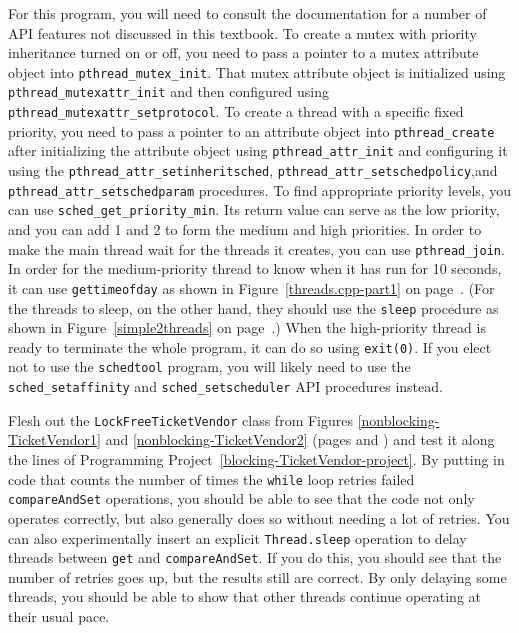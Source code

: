 \begin{chapterEnumerate}
For this program, you will need to consult the documentation for a number of API features not discussed in this textbook.  To create a mutex with priority inheritance turned on or off, you need to pass a pointer to a mutex attribute object into \verb|pthread_mutex_init|.  That mutex attribute object is initialized using \verb|pthread_mutexattr_init| and then configured using \verb|pthread_mutexattr_setprotocol|.  To create a thread with a specific fixed priority, you need to pass a pointer to an attribute object into \verb|pthread_create| after initializing the attribute object using \verb|pthread_attr_init| and configuring it using the \verb|pthread_attr_setinheritsched|, \verb|pthread_attr_setschedpolicy|,\linebreak[4] and \verb|pthread_attr_setschedparam| procedures.  To find appropriate priority levels, you can use \verb|sched_get_priority_min|.  Its return value can serve as the low priority, and you can add 1 and 2 to form the medium and high priorities.  In order to make the main thread wait for the threads it creates, you can use \verb|pthread_join|.  In order for the medium-priority thread to know when it has run for 10 seconds, it can use \verb|gettimeofday| as shown in Figure~\ref{threads.cpp-part1} on page~\pageref{threads.cpp-part1}.  (For the threads to sleep, on the other hand, they should use the \verb|sleep| procedure as
shown in Figure~\ref{simple2threads} on page~\pageref{simple2threads}.)  When the high-priority thread is ready to terminate the whole program, it can do so using \verb|exit(0)|.
If you elect not to use the \verb|schedtool| program, you will likely need to use the \verb|sched_setaffinity| and \verb|sched_setscheduler| API procedures instead.
\item\label{nonblocking-TicketVendor-project}
Flesh out the \texttt{LockFreeTicketVendor} class from Figures \ref{nonblocking-TicketVendor1} and \ref{nonblocking-TicketVendor2} (pages \pageref{nonblocking-TicketVendor1} and \pageref{nonblocking-TicketVendor2}) and test it along the lines of Programming Project~\ref{blocking-TicketVendor-project}. By putting in code that counts the number of times the \texttt{while} loop retries failed \texttt{compareAndSet} operations, you should be able to see that the code not only operates correctly, but also generally does so without needing a lot of retries.  You can also experimentally insert an explicit \texttt{Thread.sleep} operation to delay threads between \texttt{get} and \texttt{compareAndSet}.  If you do this, you should see that the number of retries goes up, but the results still are correct.  By only delaying some threads, you should be able to show that other threads continue operating at their usual pace.
\end{chapterEnumerate}

